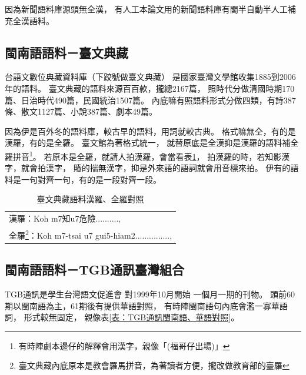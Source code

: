 因為新聞語料庫源頭無全漢，
有人工本論文用的新聞語料庫有閣半自動半人工補充全漢語料。


\subsection{閩南語語料－臺文典藏}
\label{節：臺文典藏}
台語文數位典藏資料庫（下跤號做臺文典藏）\cite{台語文數位典藏資料庫}
是國家臺灣文學館收集1885到2006年的語料。
臺文典藏的語料來源百百款，攏總2167篇，
照時代分做清國時期170篇、日治時代490篇，民國統治1507篇。
內底嘛有照語料形式分做四類，有詩387條、散文1127篇、小說387篇、劇本49篇。%

因為伊是百外冬的語料庫，較古早的語料，用詞就較古典。
格式嘛無仝，有的是漢羅，有的是全羅。
臺文館為著格式統一，
就替原底是全漢抑是漢羅的語料補全羅拼音\footnote{有時陣劇本邊仔的解釋會用漢字，親像「(福哥仔出場)」}。
若原本是全羅，就請人拍漢羅，會當看表\ref{表：臺文典藏語料}，
拍漢羅的時，若知影漢字，就會拍漢字，
賰的揣無漢字，抑是外來語的語詞就會用音標來拍。
伊有的語料是一句對齊一句，有的是一段對齊一段。

\begin{table}
\caption{臺文典藏語料漢羅、全羅對照}
\label{表：臺文典藏語料}
\centering
\begin{tabular}{l}
漢羅：Koh m7知u7危險.........., \\
全羅\footnote{臺文典藏內底原本是教會羅馬拼音，為著讀者方便，攏改做教育部的臺羅}：Koh m7-tsai u7 gui5-hiam2...............,\\
\end{tabular}
\end{table}


\subsection{閩南語語料－TGB通訊臺灣組合}
\label{節：TGB通訊－臺灣組合}
TGB通訊\cite{TGB通訊}是學生台灣語文促進會
對1999年10月開始\cite{學生台灣語文促進會對1999年10月開始}
一個月一期的刊物。
頭前60期以閩南語為主，61期後有提供華語對照，
有時陣閩南語句內底會濫一寡華語詞，
形式較無固定，
親像表\ref{表：TGB通訊閩南語、華語對照}。


